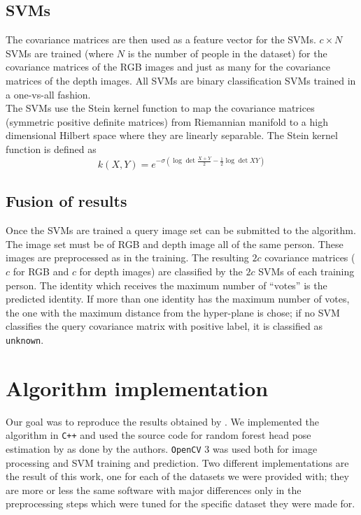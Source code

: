 \documentclass{article}
\begin{document}
\subsection{SVMs}\label{sec:svm}
The covariance matrices are then used as a feature vector for the SVMs. $c \times N$ SVMs are trained (where $N$ is the number of people in the dataset) for the covariance matrices of the RGB images and just as many for the covariance matrices of the depth images. All SVMs are binary classification SVMs trained in a one-vs-all fashion. \\
The SVMs use the Stein kernel function to map the covariance matrices (symmetric positive definite matrices) from Riemannian manifold to a high dimensional Hilbert space where they are linearly separable. The Stein kernel function is defined as
$$k(X,Y) = e^{-\sigma (\log{\det{\frac{X+Y}{2}}} - \frac{1}{2}\log{\det{XY}})}$$

\subsection{Fusion of results}
Once the SVMs are trained a query image set can be submitted to the algorithm. The image set must be of RGB and depth image all of the same person. These images are preprocessed as in the training. The resulting $2c$ covariance matrices ($c$ for RGB and $c$ for depth images) are classified by the $2c$ SVMs of each training person. The identity which receives the maximum number of ``votes'' is the predicted identity.
If more than one identity has the maximum number of votes, the one with the maximum distance from the hyper-plane is chose; if no SVM classifies the query covariance matrix with positive label, it is classified as \verb|unknown|.

\section{Algorithm implementation}\label{sec:algorithm_impl}
Our goal was to reproduce the results obtained by \citet{Hayat2016}. We implemented the algorithm in \verb|C++| and used the source code for random forest head pose estimation by \citet{Fanelli2013} as done by the authors. \verb|OpenCV| 3 was used both for image processing and SVM training and prediction. Two different implementations are the result of this work, one for each of the datasets we were provided with; they are more or less the same software with major differences only in the preprocessing steps which were tuned for the specific dataset they were made for.
\end{document}
